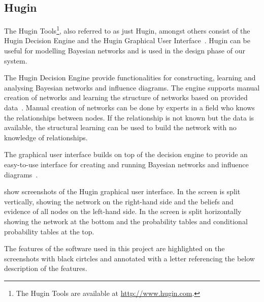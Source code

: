 \subsection{Hugin}
\label{sec:analysis:bayesian-network:hugin}

The Hugin Tools\footnote{The Hugin Tools are available at \url{http://www.hugin.com}.}, also referred to as just Hugin, amongst others consist of the Hugin Decision Engine and the Hugin Graphical User Interface~\cite{jensen2005hugin}. Hugin can be useful for modelling Bayesian networks and is used in the design phase of our system.

The Hugin Decision Engine provide functionalities for constructing, learning and analysing Bayesian networks and influence diagrams. The engine supports manual creation of networks and learning the structure of networks based on provided data~\cite{jensen2005hugin}. Manual creation of networks can be done by experts in a field who knows the relationships between nodes. If the relationship is not known but the data is available, the structural learning can be used to build the network with no knowledge of relationships.

The graphical user interface builds on top of the decision engine to provide an easy-to-use interface for creating and running Bayesian networks and influence diagrams~\cite{jensen2005hugin}.

 show screenshots of the Hugin graphical user interface.
In  the screen is split vertically, showing the network on the right-hand side and the beliefs and evidence of all nodes on the left-hand side. In  the screen is split horizontally showing the network at the bottom and the probability tables and conditional probability tables at the top.

The features of the software used in this project are highlighted on the screenshots with black cirtcles and annotated with a letter referencing the below description of the features.

